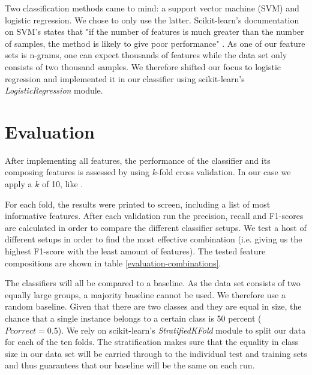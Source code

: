 \documentclass[
10pt, %
a4paper, %
oneside, %
headinclude,footinclude, %
] {book}%
\begin{document}
Two classification methods came to mind: a support vector machine (SVM) and logistic regression. We chose to only use the latter. Scikit-learn's documentation on SVM's states that "if the number of features is much greater than the number of samples, the method is likely to give poor performance" \citep{svm}.
As one of our feature sets is n-grams, one can expect thousands of features while the data set only consists of two thousand samples. We therefore shifted our focus to logistic regression and implemented it in our classifier using scikit-learn's \textit{LogisticRegression} module.

\section{Evaluation}
After implementing all features, the performance of the classifier and its composing features is assessed by using $k$-fold cross validation. In our case we apply a $k$ of 10, like \citet{flekova}.

For each fold, the results were printed to screen, including a list of most informative features. After each validation run the precision, recall and F1-scores are calculated in order to compare the different classifier setups. We test a host of different setups in order to find the most effective combination (i.e. giving us the highest F1-score with the least amount of features).  The tested feature compositions are shown in table \ref{evaluation-combinations}.

The classifiers will all be compared to a baseline. As the data set consists of two equally large groups, a majority baseline cannot be used. We therefore use a random baseline. Given that there are two classes and they are equal in size, the chance that a single instance belongs to a certain class is 50 percent ($Pcorrect = 0.5$). We rely on scikit-learn's \textit{StratifiedKFold} module to split our data for each of the ten folds. The stratification makes sure that the equality in class size in our data set will be carried through to the individual test and training sets and thus guarantees that our baseline will be the same on each run.
\end{document}
